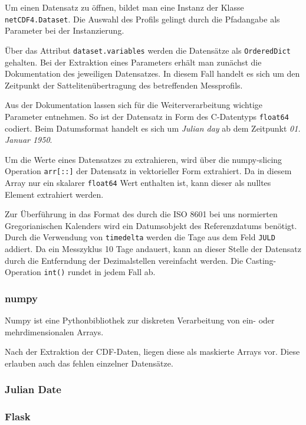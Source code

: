     Um einen Datensatz zu öffnen, bildet man eine Instanz der Klasse \texttt{netCDF4.Dataset}. Die Auswahl des Profils gelingt durch die Pfadangabe als Parameter bei der Instanzierung.
    
    Über das Attribut \texttt{dataset.variables} werden die Datensätze als \texttt{OrderedDict} gehalten. Bei der Extraktion eines Parameters erhält man zunächst die Dokumentation des jeweiligen Datensatzes. In diesem Fall handelt es sich um den Zeitpunkt der Sattelitenübertragung des betreffenden Messprofils.
    
    Aus der Dokumentation lassen sich für die Weiterverarbeitung wichtige Parameter entnehmen.
    So ist der Datensatz in Form des C-Datentyps \texttt{float64} codiert. Beim Datumsformat handelt es sich um \textit{Julian day} ab dem Zeitpunkt \textit{01. Januar 1950}.
    
    Um die Werte eines Datensatzes zu extrahieren, wird über die numpy-slicing Operation \texttt{arr[::]} der Datensatz in vektorieller Form extrahiert. Da in diesem Array nur ein skalarer \texttt{float64} Wert enthalten ist, kann dieser als nulltes Element extrahiert werden.
    
    Zur Überführung in das Format des durch die ISO 8601 bei uns normierten Gregorianischen Kalenders wird ein Datumsobjekt des Referenzdatums benötigt. Durch die Verwendung von \texttt{timedelta} werden die Tage aus dem Feld \texttt{JULD} addiert. Da ein Messzyklus 10 Tage andauert, kann an dieser Stelle der Datensatz durch die Entferndung der Dezimalstellen vereinfacht werden. Die Casting-Operation \texttt{int()} rundet in jedem Fall ab.
    
    \subsubsection{numpy}
    
    Numpy ist eine Pythonbibliothek zur diskreten Verarbeitung von ein- oder mehrdimensionalen Arrays. 
    
    Nach der Extraktion der CDF-Daten, liegen diese als maskierte Arrays vor. Diese erlauben auch das fehlen einzelner Datensätze.

\subsubsection{Julian Date}
        
    \subsubsection{Flask}
    
